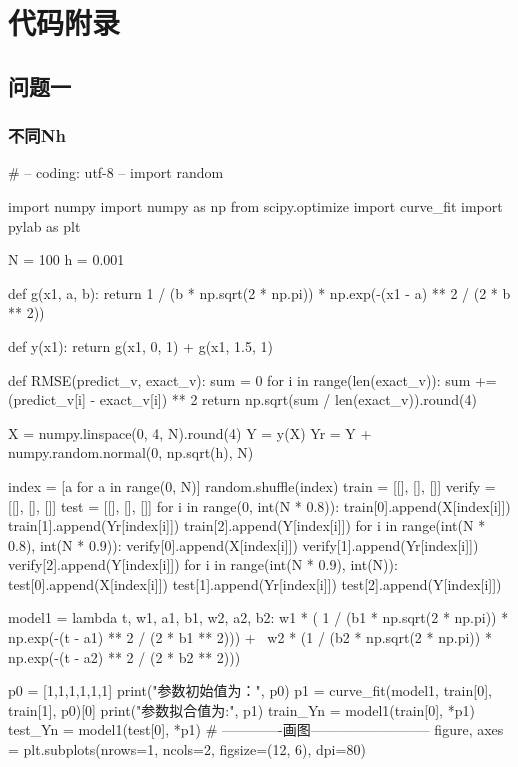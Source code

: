 \chapter{代码附录}
\section{问题一}
\subsection{不同Nh}
\begin{python}
# -- coding: utf-8 --
import random

import numpy
import numpy as np
from scipy.optimize import curve_fit
import pylab as plt

N = 100
h = 0.001


def g(x1, a, b):
    return 1 / (b * np.sqrt(2 * np.pi)) * np.exp(-(x1 - a) ** 2 / (2 * b ** 2))


def y(x1):
    return g(x1, 0, 1) + g(x1, 1.5, 1)


def RMSE(predict_v, exact_v):
    sum = 0
    for i in range(len(exact_v)):
        sum += (predict_v[i] - exact_v[i]) ** 2
    return np.sqrt(sum / len(exact_v)).round(4)


X = numpy.linspace(0, 4, N).round(4)
Y = y(X)
Yr = Y + numpy.random.normal(0, np.sqrt(h), N)

index = [a for a in range(0, N)]
random.shuffle(index)
train = [[], [], []]
verify = [[], [], []]
test = [[], [], []]
for i in range(0, int(N * 0.8)):
    train[0].append(X[index[i]])
    train[1].append(Yr[index[i]])
    train[2].append(Y[index[i]])
for i in range(int(N * 0.8), int(N * 0.9)):
    verify[0].append(X[index[i]])
    verify[1].append(Yr[index[i]])
    verify[2].append(Y[index[i]])
for i in range(int(N * 0.9), int(N)):
    test[0].append(X[index[i]])
    test[1].append(Yr[index[i]])
    test[2].append(Y[index[i]])

model1 = lambda t, w1, a1, b1, w2, a2, b2: w1 * (
        1 / (b1 * np.sqrt(2 * np.pi)) * np.exp(-(t - a1) ** 2 / (2 * b1 ** 2))) + \
                                           w2 * (1 / (b2 * np.sqrt(2 * np.pi)) * np.exp(-(t - a2) ** 2 / (2 * b2 ** 2)))

p0 = [1,1,1,1,1,1]
print("参数初始值为：", p0)
p1 = curve_fit(model1, train[0], train[1], p0)[0]
print("参数拟合值为:", p1)
train_Yn = model1(train[0], *p1)
test_Yn = model1(test[0], *p1)
# -------------画图--------------------------
figure, axes = plt.subplots(nrows=1, ncols=2, figsize=(12, 6), dpi=80)


\end{python}
